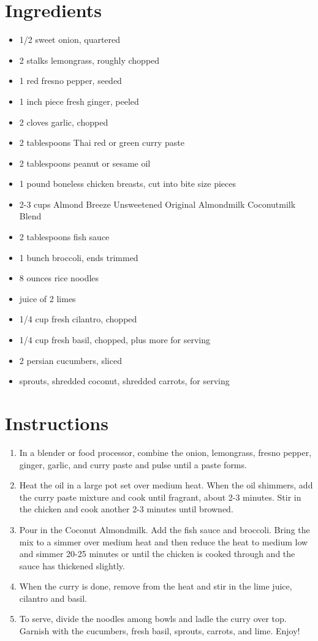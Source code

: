\documentclass[
  letterpaper,
  DIV=11,
  numbers=noendperiod,
  titlepage=false]{scrreprt}
\providecommand{\tightlist}{%
  \setlength{\itemsep}{0pt}\setlength{\parskip}{0pt}}\usepackage{longtable,booktabs,array}
\begin{document}
\section{Ingredients}\label{ingredients-127}

\begin{itemize}
\tightlist
\item
  1/2 sweet onion, quartered
\item
  2 stalks lemongrass, roughly chopped
\item
  1 red fresno pepper, seeded
\item
  1 inch piece fresh ginger, peeled
\item
  2 cloves garlic, chopped
\item
  2 tablespoons Thai red or green curry paste
\item
  2 tablespoons peanut or sesame oil
\item
  1 pound boneless chicken breasts, cut into bite size pieces
\item
  2-3 cups Almond Breeze Unsweetened Original Almondmilk Coconutmilk
  Blend
\item
  2 tablespoons fish sauce
\item
  1 bunch broccoli, ends trimmed
\item
  8 ounces rice noodles
\item
  juice of 2 limes
\item
  1/4 cup fresh cilantro, chopped
\item
  1/4 cup fresh basil, chopped, plus more for serving
\item
  2 persian cucumbers, sliced
\item
  sprouts, shredded coconut, shredded carrots, for serving
\end{itemize}

\section{Instructions}\label{instructions-127}

\begin{enumerate}
\def\labelenumi{\arabic{enumi}.}
\tightlist
\item
  In a blender or food processor, combine the onion, lemongrass, fresno
  pepper, ginger, garlic, and curry paste and pulse until a paste forms.
\item
  Heat the oil in a large pot set over medium heat. When the oil
  shimmers, add the curry paste mixture and cook until fragrant, about
  2-3 minutes. Stir in the chicken and cook another 2-3 minutes until
  browned.
\item
  Pour in the Coconut Almondmilk. Add the fish sauce and broccoli. Bring
  the mix to a simmer over medium heat and then reduce the heat to
  medium low and simmer 20-25 minutes or until the chicken is cooked
  through and the sauce has thickened slightly.
\item
  When the curry is done, remove from the heat and stir in the lime
  juice, cilantro and basil.
\item
  To serve, divide the noodles among bowls and ladle the curry over top.
  Garnish with the cucumbers, fresh basil, sprouts, carrots, and lime.
  Enjoy!
\end{enumerate}
\end{document}
